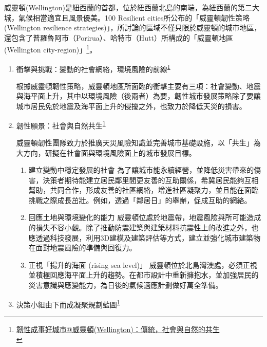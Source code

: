 \documentclass[a4paper,12pt]{article}
\begin{document}
\begin{enumerate}
威靈頓(Wellington)是紐西蘭的首都，位於紐西蘭北島的南端，為紐西蘭的第二大城，氣候相當適宜且風景優美。100 Resilient cities所公布的「威靈頓韌性策略(Wellington resilience strategies)」，所討論的區域不僅只限於威靈頓的城市地區，還包含了普羅魯阿市（Porirua）、哈特市（Hutt）所構成的「威靈頓地區(Wellington city-region)」\footnote{\href{https://eyesonplace.net/2018/12/19/9738/}{韌性成事好城市@威靈頓(Wellington)：傳統，社會與自然的共生}\\\label{orgc61b7e2}}。\\
\begin{enumerate}
\item 衝擊與挑戰：變動的社會網絡，環境風險的前線\textsuperscript{\ref{orgc61b7e2}}
\label{sec:orga2f35da}

根據威靈頓韌性策略，威靈頓地區所面臨的衝擊主要有三項：社會變動、地震與海平面上升，其中以環境風險（後兩者）為要，韌性城市發展策略除了要讓城市居民免於地震及海平面上升的侵擾之外，也致力於降低天災的損害。\\

\item 韌性願景：社會與自然共生\textsuperscript{\ref{orgc61b7e2}}
\label{sec:orgceb0c56}

威靈頓韌性團隊致力於推廣天災風險知識並完善城市基礎設施，以「共生」為大方向，研擬在社會面與環境風險面上的城市發展目標。\\
\begin{enumerate}
\item 建立變動中穩定發展的社會   為了讓城市能永續經營，並降低災害帶來的傷害，決策者期待能建立居民鄰里間更友善的互助關係，希冀居民能夠互相幫助，共同合作，形成友善的社區網絡，增進社區凝聚力，並且能在面臨挑戰之際成長茁壯。例如，透過「鄰居日」的舉辦，促成互助的網絡。\\
\item 回應土地與環境變化的能力   威靈頓位處於地震帶，地震風險與所可能造成的損失不容小覷。除了推動防震建築與建築材料抗震性上的改進之外，也應透過科技發展，利用3D建模及建築評估等方式，建立並強化城市建築物在面對地震風險的準備與回復力。\\
\item 正視「揚升的海面 (rising sea level)」   威靈頓位於北島灣澳處，必須正視並積極回應海平面上升的趨勢。在都市設計中重新擁抱水，並加強居民的災害意識與應變能力，為日後的氣候適應計劃做好萬全準備。\\
\end{enumerate}

\item 決策小組由下而成凝聚規劃藍圖\textsuperscript{\ref{orgc61b7e2}}
\label{sec:org397af44}


\end{enumerate}
\end{enumerate}
\end{document}
